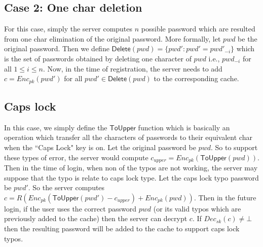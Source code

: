 \subsection{Case 2: One char deletion}
For this case, simply the server computes $ n $ possible password which are resulted from one char elimination of the original password. More formally, let $ pwd $ be the original password.  Then we define $ \mathsf{Delete}(pwd)  = \{pwd': pwd' = pwd'_{-i} \}$ which is the set of passwords obtained by deleting one character of $ pwd $ i.e., $ pwd_{-i} $ for all $ 1\leq i\leq n $. Now, in the time of registration, the server needs to add $ c = Enc_{pk}(pwd') $ for all $ pwd'\in \mathsf{Delete}(pwd) $ to the corresponding cache.




\subsection{Caps lock}
In this case, we simply define the $ \mathsf{ToUpper} $ function which is basically an operation which transfer all the characters of passwords to their equivalent char when the ``Caps Lock" key is on. Let the original password be $ pwd $. So to support these types of error, the server would compute $ c_{upper} = Enc_{pk} (\mathsf{ToUpper}(pwd)) $. Then in the time of login, when non of the typos are not working, the server may suppose that the typo is relate to caps lock type. Let the caps lock typo password be $ pwd' $. So the server computes $ c = R (Enc_{pk} (\mathsf{ToUpper}(pwd')  - c_{upper}) + Enc_{pk} (pwd) ) $. Then in the future login, if the user uses the correct password $ pwd $ (or its valid typos which are previously added to the cache) then the server can decrypt $ c $. If $ Dec_{sk} (c) \neq \bot$ then the resulting password will be added to the cache to support caps lock typos. 

